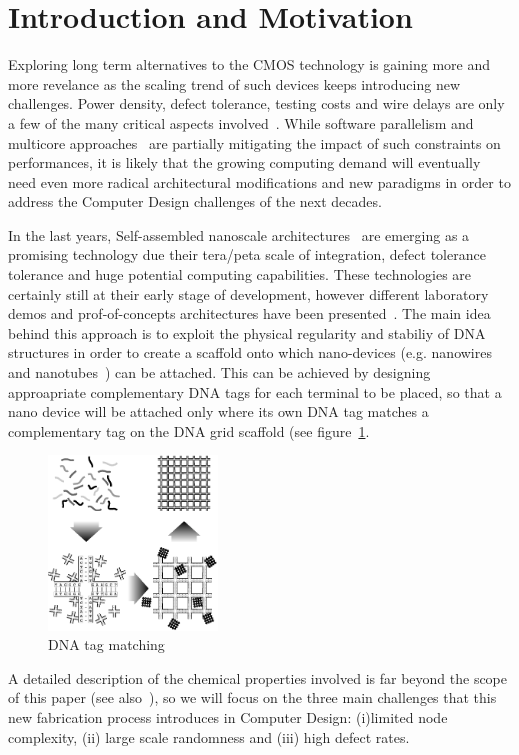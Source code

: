 
\section{Introduction and Motivation}

Exploring long term alternatives to the CMOS technology is gaining
more and more revelance as the scaling trend of such devices keeps
introducing new challenges. Power density, defect tolerance, testing
costs and wire delays are only a few of the many critical aspects
involved~\cite{itrs12}. While software parallelism and multicore
approaches~\cite{TODO1} are partially mitigating the impact of such
constraints on performances, it is likely that the growing computing demand will
eventually need even more radical architectural modifications and new
paradigms in order to address the Computer Design challenges of the next
decades.

In the last years, Self-assembled nanoscale architectures~\cite{TODO2}
are emerging as a promising technology due their tera/peta scale of
integration, defect tolerance tolerance and huge potential computing
capabilities. These technologies are certainly still at
their early stage of development, however different laboratory demos and
prof-of-concepts architectures have been presented~\cite{TODO3}.
The main idea behind this approach is to exploit the physical regularity and
stabiliy of DNA structures in order to create a scaffold onto which
nano-devices (e.g. nanowires and nanotubes~\cite{TODO4}) can be
attached. This can be achieved by designing approapriate complementary DNA tags for
each terminal to be placed, so that a nano device will be attached
only where its own DNA tag matches a complementary tag on the DNA grid
scaffold (see figure~\ref{fig:dna_tag}.
\begin{figure}
  \centering
    \includegraphics[width=0.40\textwidth]{pictures/dna2b.eps}
  \caption{DNA tag matching}
  \label{fig:dna_tag}
\end{figure}
A detailed description of the chemical properties involved is far
beyond the scope of this paper (see also~\cite{TODO5}), so we will focus on
the three main challenges that this new fabrication process introduces
in Computer Design: (i)limited node complexity, (ii) large scale
randomness and (iii) high defect rates.  

